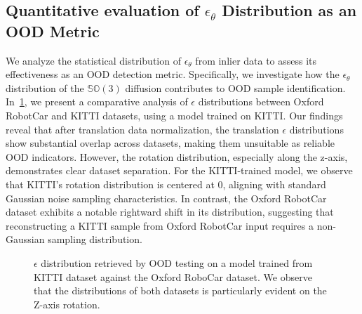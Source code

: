 \subsection{Quantitative evaluation of $\epsilon_{\theta}$ Distribution as an OOD Metric}
We analyze the statistical distribution of $\epsilon_{\theta}$ from inlier data to assess its effectiveness as an \ac{OOD} detection metric. Specifically, we investigate how the $\epsilon_{\theta}$ distribution of the $\mathbb{SO}(3)$ diffusion contributes to OOD sample identification. In~\cref{fig:eps_oxford_kitti}, we present a comparative analysis of $\epsilon$ distributions between Oxford RobotCar and KITTI datasets, using a model trained on KITTI. Our findings reveal that after translation data normalization, the translation $\epsilon$ distributions show substantial overlap across datasets, making them unsuitable as reliable OOD indicators. However, the rotation distribution, especially along the z-axis, demonstrates clear dataset separation. For the KITTI-trained model, we observe that KITTI's rotation distribution is centered at 0, aligning with standard Gaussian noise sampling characteristics. In contrast, the Oxford RobotCar dataset exhibits a notable rightward shift in its distribution, suggesting that reconstructing a KITTI sample from Oxford RobotCar input requires a non-Gaussian sampling distribution.

\begin{figure}[h!]
\centering
    \hfill
\vskip -0.2in
\caption{$\epsilon$ distribution retrieved by OOD testing on a model trained from KITTI dataset against the Oxford RoboCar dataset. We observe that the distributions of both datasets is particularly evident on the Z-axis rotation.}
\label{fig:eps_oxford_kitti}
\end{figure}

